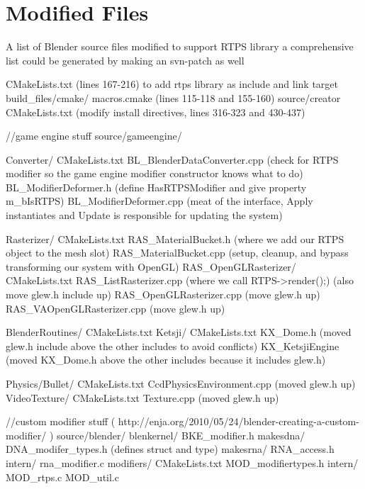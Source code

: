

\section{Modified Files}
\label{appendix:modified}
A list of Blender source files modified to support RTPS library
a comprehensive list could be generated by making an svn-patch as well

\begin{cppcode}{0}

CMakeLists.txt (lines 167-216) to add rtps library as include and link target
build_files/cmake/
    macros.cmake (lines 115-118 and 155-160)
source/creator
    CMakeLists.txt (modify install directives, lines 316-323 and 430-437)

//game engine stuff
source/gameengine/

    Converter/
        CMakeLists.txt
        BL_BlenderDataConverter.cpp (check for RTPS modifier so the game engine modifier constructor knows what to do)
        BL_ModifierDeformer.h (define HasRTPSModifier and give property m_bIsRTPS)
        BL_ModifierDeformer.cpp (meat of the interface, Apply instantiates and Update is responsible for updating the system)       
 
    Rasterizer/
        CMakeLists.txt
        RAS_MaterialBucket.h (where we add our RTPS object to the mesh slot)
        RAS_MaterialBucket.cpp (setup, cleanup, and bypass transforming our system with OpenGL)
        RAS_OpenGLRasterizer/
            CMakeLists.txt
            RAS_ListRasterizer.cpp (where we call RTPS->render();) (also move glew.h include up)
            RAS_OpenGLRasterizer.cpp (move glew.h up)
            RAS_VAOpenGLRasterizer.cpp (move glew.h up)

    BlenderRoutines/
        CMakeLists.txt
    Ketsji/
        CMakeLists.txt
        KX_Dome.h (moved glew.h include above the other includes to avoid conflicts)
        KX_KetsjiEngine (moved KX_Dome.h above the other includes because it includes glew.h)

    Physics/Bullet/
        CMakeLists.txt
        CcdPhysicsEnvironment.cpp (moved glew.h up) 
    VideoTexture/
        CMakeLists.txt 
        Texture.cpp (moved glew.h up)

//custom modifier stuff ( http://enja.org/2010/05/24/blender-creating-a-custom-modifier/ )
source/blender/
    blenkernel/
        BKE_modifier.h
    makesdna/
        DNA_modifer_types.h (defines struct and type)
    makesrna/
        RNA_access.h 
        intern/
            rna_modifier.c
    modifiers/
        CMakeLists.txt
        MOD_modifiertypes.h
        intern/
            MOD_rtps.c
            MOD_util.c
    

\end{cppcode}
